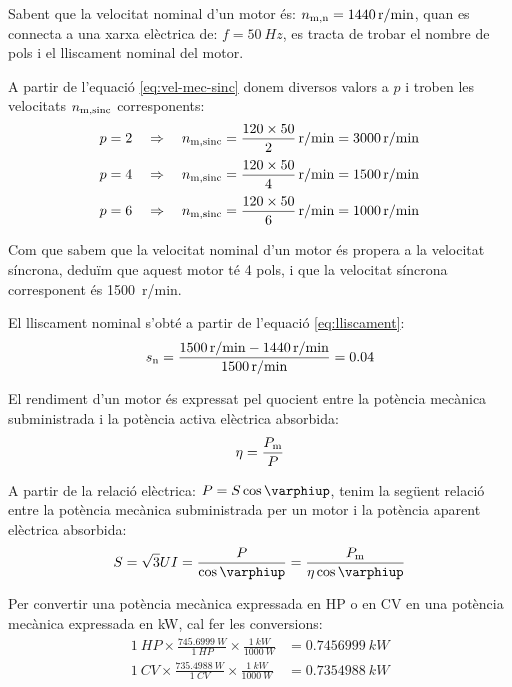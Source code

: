 	
\begin{exemple}[\MotorNombrePols{}]
	\addcontentsxms{\MotorNombrePols}
    Sabent que la velocitat nominal d'un motor és: $n_\mathrm{m,n} = \qty{1440}{r/min}$, quan es connecta a una xarxa elèctrica de: $f = \qty{50}{Hz}$,  es tracta de trobar el nombre de pols i el lliscament nominal del motor.

    A partir de l'equació \eqref{eq:vel-mec-sinc} donem diversos valors a $p$ i troben les velocitats $n_\mathrm{m,sinc}$ corresponents:
    \begin{align*}
      p = 2 \quad  &\Rightarrow \quad n\ped{m,sinc} = \frac{120 \times 50}{2} \, \unit{r/min} = \qty{3000}{r/min}\\[0.5ex]
      p = 4 \quad  &\Rightarrow \quad n\ped{m,sinc} = \frac{120 \times 50}{4} \, \unit{r/min} = \qty{1500}{r/min}\\[0.5ex]
      p = 6 \quad  &\Rightarrow \quad n\ped{m,sinc} = \frac{120 \times 50}{6} \, \unit{r/min} = \qty{1000}{r/min}
    \end{align*}

    Com que sabem que la velocitat nominal d'un motor és propera a la velocitat síncrona, deduïm que aquest motor té 4 pols, i que la velocitat síncrona corresponent és \qty{1500}{r/min}.

    El lliscament nominal s'obté a partir de l'equació \eqref{eq:lliscament}:
    \[
      s_\mathrm{n} = \frac{\qty{1500}{r/min} - \qty{1440}{r/min}}{\qty{1500}{r/min}} = \num{0,04}
    \]
\end{exemple}

El rendiment d'un motor és expressat pel quocient entre la potència mecànica subministrada i la potència activa elèctrica absorbida:
\begin{equation}\index{rendiment}\index{potència mecànica}
    \eta = \frac{P\ped{m}}{P}
\end{equation}

A partir de la relació elèctrica: $P = S \cos\varphiup$, tenim la següent relació entre la potència mecànica subministrada per un motor i la potència aparent elèctrica absorbida:
\begin{equation}
    S = \sqrt{3} U I = \frac{P}{\cos\varphiup} = \frac{P\ped{m}}{\eta \cos\varphiup}\label{eq:mot-S-Pm}
\end{equation}

Per  convertir una potència mecànica expressada en HP o en CV en una  potència mecànica expressada en kW, cal  fer les conversions:
\begin{subequations}
\begin{align}
  \qty{1}{HP} \times \frac{\qty{745,6999}{W}}{\qty{1}{HP}} \times \frac{\qty{1}{kW}}{\qty{1000}{W}} &= \qty{0,7456999}{kW} \\[1ex]
  \qty{1}{CV} \times \frac{\qty{735,4988}{W}}{\qty{1}{CV}} \times \frac{\qty{1}{kW}}{\qty{1000}{W}} &= \qty{0,7354988}{kW}
\end{align}
\end{subequations}

